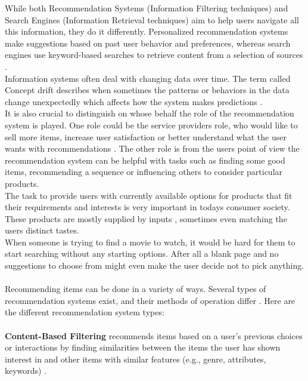 \documentclass[10pt, oneside,english,hidelinks,a4paper]{article}
\begin{document}
\begin{multicols}{2}
%
While both Recommendation Systems (Information Filtering techniques) and Search Engines (Information Retrieval techniques) aim to help users navigate all this information, they do it differently. Personalized recommendation systems make suggestions based on past user behavior and preferences, whereas search engines use keyword-based searches to retrieve content from a selection of sources \cite{De_Nart201484}.\\
%
Information systems often deal with changing data over time. The term called Concept drift describes when sometimes the patterns or behaviors in the data change unexpectedly which affects how the system makes predictions \cite{Sun2024}.\\
It is also crucial to distinguish on whose behalf the role of the recommendation system is played. One role could be the service providers role, who would like to sell more items, increase user satisfaction or better understand what the user wants with recommendations \cite{Ricci20221}. The other role is from the users point of view the recommendation system can be helpful with tasks such as finding some good items, recommending a sequence or influencing others to consider particular products.\\
The task to provide users with currently available options for products that fit their requirements and interests is very important in todays consumer society. These products are mostly supplied by inputs \cite{Philip2014} , sometimes even matching the users distinct tastes.\\
%
When someone is trying to find a movie to watch, it would be hard for them to start searching without any starting options. After all a blank page and no suggestions to choose from might even make the user decide not to pick anything. \\\\
%
%
Recommending items can be done in a variety of ways. Several types of recommendation systems exist, and their methods of operation differ \cite{Roy2022}. Here are the different recommendation system types:\\\\
%
%
\textbf{Content-Based Filtering} recommends items based on a user's previous choices or interactions by finding similarities between the items the user has shown interest in and other items with similar features (e.g., genre, attributes, keywords) \cite{pub.1034486657}.\\

\end{multicols}
\end{document}

